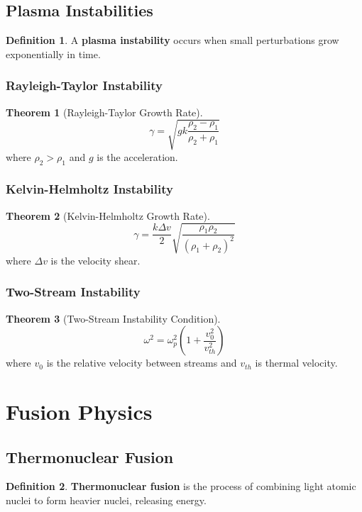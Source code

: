 \documentclass[11pt]{article}
\theoremstyle{definition}
\newtheorem{definition}{Definition}[section]
\newtheorem{theorem}{Theorem}[section]
\begin{document}
\subsection{Plasma Instabilities}
\begin{definition}
A \textbf{plasma instability} occurs when small perturbations grow exponentially in time.
\end{definition}

\subsubsection{Rayleigh-Taylor Instability}
\begin{theorem}[Rayleigh-Taylor Growth Rate]
$$\gamma = \sqrt{gk \frac{\rho_2 - \rho_1}{\rho_2 + \rho_1}}$$
where $\rho_2 > \rho_1$ and $g$ is the acceleration.
\end{theorem}

\subsubsection{Kelvin-Helmholtz Instability}
\begin{theorem}[Kelvin-Helmholtz Growth Rate]
$$\gamma = \frac{k \Delta v}{2} \sqrt{\frac{\rho_1 \rho_2}{(\rho_1 + \rho_2)^2}}$$
where $\Delta v$ is the velocity shear.
\end{theorem}

\subsubsection{Two-Stream Instability}
\begin{theorem}[Two-Stream Instability Condition]
$$\omega^2 = \omega_p^2 \left(1 + \frac{v_0^2}{v_{th}^2}\right)$$
where $v_0$ is the relative velocity between streams and $v_{th}$ is thermal velocity.
\end{theorem}

\section{Fusion Physics}

\subsection{Thermonuclear Fusion}
\begin{definition}
\textbf{Thermonuclear fusion} is the process of combining light atomic nuclei to form heavier nuclei, releasing energy.
\end{definition}
\end{document}
